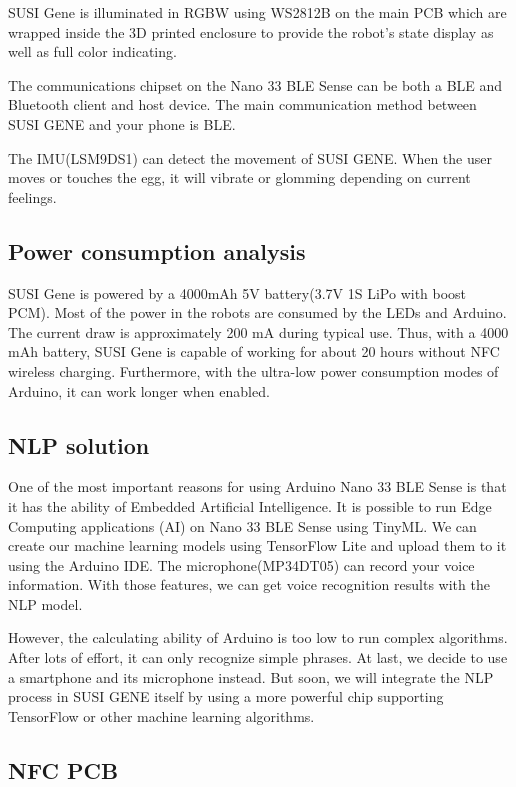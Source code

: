\documentclass[manuscript,screen]{acmart}
\begin{document}
SUSI Gene is illuminated in RGBW using WS2812B on the main PCB which are wrapped inside the 3D printed enclosure to provide the robot’s state display as well as full color indicating.

The communications chipset on the Nano 33 BLE Sense can be both a BLE and Bluetooth client and host device. The main communication method between SUSI GENE and your phone is BLE.

The IMU(LSM9DS1) can detect the movement of SUSI GENE. When the user moves or touches the egg, it will vibrate or glomming depending on current feelings.

\subsection{Power consumption analysis}

SUSI Gene is powered by a 4000mAh 5V battery(3.7V 1S LiPo with boost PCM). Most of the power in the robots are consumed by the LEDs and Arduino. The current draw is approximately 200 mA during typical use. Thus, with a 4000 mAh battery, SUSI Gene is capable of working for about 20 hours without NFC wireless charging. Furthermore, with the ultra-low power consumption modes of Arduino, it can work longer when enabled.

\subsection{NLP solution}

One of the most important reasons for using Arduino Nano 33 BLE Sense is that it has the ability of Embedded Artificial Intelligence. It is possible to run Edge Computing applications (AI) on Nano 33 BLE Sense using TinyML. We can create our machine learning models using TensorFlow Lite and upload them to it using the Arduino IDE. The microphone(MP34DT05) can record your voice information. With those features, we can get voice recognition results with the NLP model.

However, the calculating ability of Arduino is too low to run complex algorithms. After lots of effort, it can only recognize simple phrases. At last, we decide to use a smartphone and its microphone instead. But soon, we will integrate the NLP process in SUSI GENE itself by using a more powerful chip supporting TensorFlow or other machine learning algorithms. 

\subsection{NFC PCB}
\end{document}
